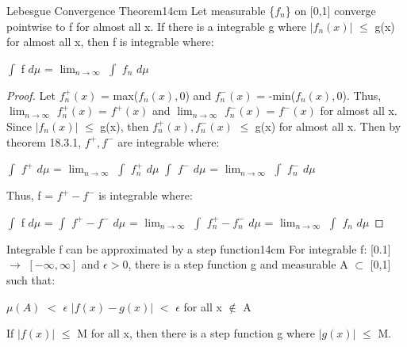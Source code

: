     \begin{wtheorem}{Lebesgue Convergence Theorem}{14cm}
        Let measurable \{$f_n$\} on [0,1] converge pointwise to f
        for almost all x. If there is a integrable g where
        $|f_n(x)|$ $\leq$ g(x) for almost all x, then f is integrable where:

        \hspace{0.5cm}
        $\int$ f $d\mu$ = $\lim_{n \rightarrow \infty}$ $\int$ $f_n$ $d\mu$
    \end{wtheorem}

    \begin{proof}
        Let $f_n^+(x)$ = max($f_n(x),0$) and $f_n^-(x)$ = -min($f_n(x),0$).
        Thus, $\lim_{n \rightarrow \infty}$ $f_n^+(x)$ = $f^+(x)$
        and $\lim_{n \rightarrow \infty}$ $f_n^-(x)$ = $f^-(x)$
        for almost all x.
        Since $|f_n(x)|$ $\leq$ g(x), then
        $f_n^+(x),f_n^-(x)$ $\leq$ g(x) for almost all x.
        Then by {\color{red} theorem 18.3.1}, $f^+,f^-$ are integrable where:

        \hspace{0.5cm}
        $\int$ $f^+$ $d\mu$
        = $\lim_{n \rightarrow \infty}$ $\int$ $f_n^+$ $d\mu$
        \hspace{1cm}
        $\int$ $f^-$ $d\mu$
        = $\lim_{n \rightarrow \infty}$ $\int$ $f_n^-$ $d\mu$

        Thus, f = $f^+ - f^-$ is integrable where:

        \hspace{0.5cm}
        $\int$ f $d\mu$
        = $\int$ $f^+ - f^-$ $d\mu$
        = $\lim_{n \rightarrow \infty}$ $\int$ $f_n^+ - f_n^-$ $d\mu$
        = $\lim_{n \rightarrow \infty}$ $\int$ $f_n$ $d\mu$
    \end{proof}

    \newpage



    \begin{wtheorem}{Integrable f can be approximated by a step function}{14cm}
        For integrable f: [0.1] $\rightarrow$ $[-\infty,\infty]$
        and $\epsilon > 0$, there is a step function g
        and measurable A $\subset$ [0,1] such that:
        
        \hspace{0.5cm}
        $\mu(A)$ $<$ $\epsilon$
        \hspace{1cm}
        $|f(x) - g(x)|$ $<$ $\epsilon$
        for all x $\not \in$ A

        If $|f(x)|$ $\leq$ M for all x, then
        there is a step function g where $|g(x)|$ $\leq$ M.
    \end{wtheorem}

